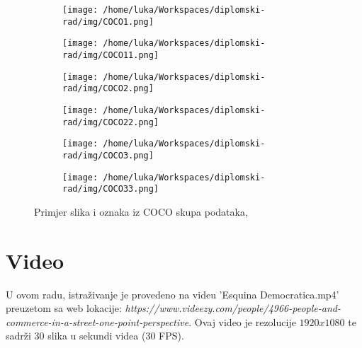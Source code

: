 \begin{figure}[htp]
	\centering
	\begin{subfigure}[b]{0.4\linewidth}
		\texttt{[image: /home/luka/Workspaces/diplomski-rad/img/COCO1.png]}
	\end{subfigure}
	\begin{subfigure}[b]{0.4\linewidth}
		\texttt{[image: /home/luka/Workspaces/diplomski-rad/img/COCO11.png]}
	\end{subfigure}
	\begin{subfigure}[b]{0.4\linewidth}
		\texttt{[image: /home/luka/Workspaces/diplomski-rad/img/COCO2.png]}
	\end{subfigure}
	\begin{subfigure}[b]{0.4\linewidth}
		\texttt{[image: /home/luka/Workspaces/diplomski-rad/img/COCO22.png]}
	\end{subfigure}
	\begin{subfigure}[b]{0.4\linewidth}
		\texttt{[image: /home/luka/Workspaces/diplomski-rad/img/COCO3.png]}
	\end{subfigure}
	\begin{subfigure}[b]{0.4\linewidth}
		\texttt{[image: /home/luka/Workspaces/diplomski-rad/img/COCO33.png]}
	\end{subfigure}
	\caption{Primjer slika i oznaka iz COCO skupa podataka, \citep{coco}}
	\label{img:coco-samples}
\end{figure}

\section{Video}

U ovom radu, istraživanje je provedeno na videu 'Esquina Democratica.mp4' preuzetom sa web lokacije: \textit{https://www.videezy.com/people/4966-people-and-commerce-in-a-street-one-point-perspective}. Ovaj video je rezolucije $1920x1080$ te sadrži 30 slika u sekundi videa (30 FPS).


